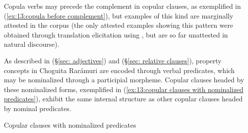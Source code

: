 
Copula verbs may precede the complement in copular clauses, as exemplified in (\ref{ex:13:copula before complement}), but examples of this kind are marginally attested in the corpus (the only attested examples showing this pattern were obtained through translation elicitation using , but are so far unattested in natural discourse).

\ea\label{ex:13:copula before complement}

    \z
\z

As described in  (§\ref{sec: adjectives}) and  (§\ref{sec: relative clauses}), property concepts in Choguita Rarámuri are encoded through verbal predicates, which may be nominalized through a participial morpheme. Copular clauses headed by these nominalized forms, exemplified in (\ref{ex:13:copular clauses with nominalized predicates}), exhibit the same internal structure as other copular clauses headed by nominal predicates.

\largerpage[2]
\ea\label{ex:13:copular clauses with nominalized predicates}
{Copular clauses with nominalized predicates}


